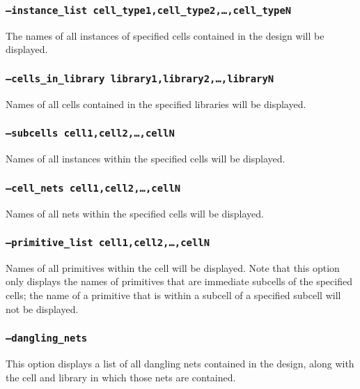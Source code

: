 \subsubsection{\texttt{--instance\_list
cell\_type1,cell\_type2,\ldots,cell\_typeN}}
The names of all instances of specified cells contained in the design will be displayed.

\subsubsection{\texttt{--cells\_in\_library library1,library2,\ldots,libraryN}}
Names of all cells contained in the specified libraries will be displayed.

\subsubsection{\texttt{--subcells cell1,cell2,\ldots,cellN}}
Names of all instances within the specified cells will be displayed.

\subsubsection{\texttt{--cell\_nets cell1,cell2,\ldots,cellN}}
Names of all nets within the specified cells will be displayed.

\subsubsection{\texttt{--primitive\_list cell1,cell2,\ldots,cellN}}
Names of all primitives within the cell will be displayed. Note that
this option only displays the names of primitives that are immediate
subcells of the specified cells; the name of a primitive that is within
a subcell of a specified subcell will not be displayed.

\subsubsection{\texttt{--dangling\_nets}}
This option displays a list of all dangling nets contained in the
design, along with the cell and library in which those nets are
contained.
